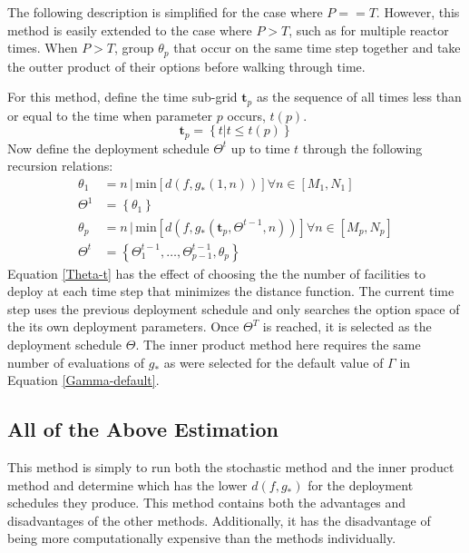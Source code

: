 The following description is simplified for the case where $P==T$. However, 
this method is easily extended to the case where $P > T$, such as for 
multiple reactor times.  When $P > T$, group $\theta_p$ that occur on the 
same time step together and take the outter product of their options before
walking through time.

For this method, define the time sub-grid $\mathbf{t}_p$ as the sequence of
all times less than or equal to the time when parameter $p$ occurs, $t(p)$.
\begin{equation}
\label{t-p}
\mathbf{t}_p = \left\{t | t \le t(p)\right\}
\end{equation}
Now define the deployment schedule $\Theta^t$ up to time $t$ through the
following recursion relations:
\begin{equation}
\label{Theta-t}
\begin{split}
\theta_1 & = n \, | \, \mathrm{min}\left[d(f, g_*(1, n))\right]
                       \forall n\in[M_1, N_1] \\
\Theta^1 & = \left\{\theta_1\right\}\\
\theta_p & = n \, | \, \mathrm{min}\left[d(f, g_*(\mathbf{t}_p, 
                                                  \Theta^{t-1}, n))\right]
                       \forall n\in[M_p, N_p] \\
\Theta^t & = \left\{\Theta_1^{t-1}, \ldots, \Theta_{p-1}^{t-1}, \theta_p\right\}
\end{split}
\end{equation}
Equation \ref{Theta-t} has the effect of choosing the the number of 
facilities to deploy at each time step that minimizes the distance function.
The current time step uses the previous deployment schedule and only searches
the option space of the its own deployment parameters. Once $\Theta^T$ is 
reached, it is selected as the deployment schedule $\Theta$. The inner 
product method here requires the same number of evaluations of $g_*$ as 
were selected for the default value of $\Gamma$ in Equation 
\ref{Gamma-default}.



\subsection{All of the Above Estimation}
\label{all}

This method is simply to run both the stochastic method and the inner product
method and determine which has the lower $d(f, g_*)$ for the deployment 
schedules they produce.  This method contains both the advantages and 
disadvantages of the other methods.  Additionally, it has the disadvantage 
of being more computationally expensive than the methods individually.

